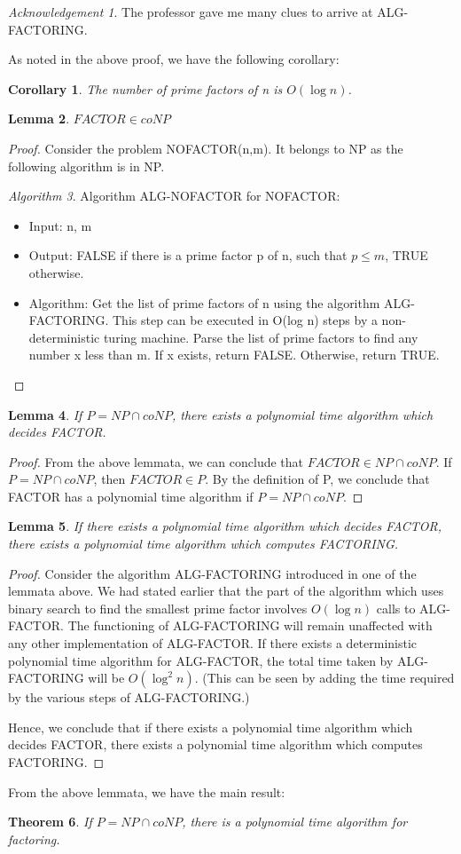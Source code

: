 \documentclass[10pt]{amsart}
\newtheorem{thm}{Theorem}[subsection]
\newtheorem{cor}[thm]{Corollary}
\newtheorem{lem}[thm]{Lemma}
\theoremstyle{remark}
\newtheorem*{ack}{Acknowledgement}
\newtheorem{alg}[thm]{Algorithm}
\begin{document}
\begin{ack}
The professor gave me many clues to arrive at ALG-FACTORING.
\end{ack}


As noted in the above proof, we have the following corollary:
\begin{cor}
The number of prime factors of n is $O(\log n)$.
\end{cor}

\begin{lem}
$FACTOR \in coNP$
\end{lem}
\begin{proof}
Consider the problem NOFACTOR(n,m). It belongs to NP as the following algorithm is in NP.
\begin{alg}
Algorithm ALG-NOFACTOR for NOFACTOR:
\begin{itemize}
\item Input: n, m
\item Output: FALSE if there is a prime factor p of n, such that $p \leq m$, TRUE otherwise.
\item Algorithm:
\subitem Get the list of prime factors of n using the algorithm ALG-FACTORING. This step can be executed in O(log n) steps by a non-deterministic turing machine.
\subitem Parse the list of prime factors to find any number x less than m. If x exists, return FALSE. Otherwise, return TRUE.
\end{itemize}
\end{alg}

\end{proof}

\begin{lem}
If $P = NP \cap coNP$, there exists a polynomial time algorithm which decides FACTOR.
\end{lem}
\begin{proof}
From the above lemmata, we can conclude that $FACTOR \in NP \cap coNP$. If $P = NP \cap coNP$, then $FACTOR \in P$. By the definition of P, we conclude that FACTOR has a polynomial time algorithm if $P = NP \cap coNP$.
\end{proof}

\begin{lem}
If there exists a polynomial time algorithm which decides FACTOR, there exists a polynomial time algorithm which computes FACTORING.
\end{lem}
\begin{proof}
Consider the algorithm ALG-FACTORING introduced in one of the lemmata above. We had stated earlier that the part of the algorithm which uses binary search to find the smallest prime factor involves $O(\log n)$ calls to ALG-FACTOR. The functioning of ALG-FACTORING will remain unaffected with any other implementation of ALG-FACTOR. If there exists a deterministic polynomial time algorithm for ALG-FACTOR, the total time taken by ALG-FACTORING will be $O(\log^{2} n)$. (This can be seen by adding the time required by the various steps of ALG-FACTORING.)

Hence, we conclude that if there exists a polynomial time algorithm which decides FACTOR, there exists a polynomial time algorithm which computes FACTORING.
\end{proof}

From the above lemmata, we have the main result:
\begin{thm}
If $P = NP \cap coNP$, there is a polynomial time algorithm for factoring.
\end{thm}



\end{document}
